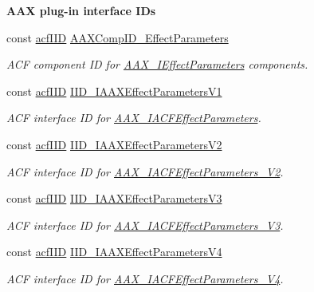 \begin{Indent}{\bf A\+A\+X plug-\/in interface I\+Ds}\par
\begin{DoxyCompactItemize}
\item 
const \hyperlink{a00150_a59df0b41744eee7a066787aaedf97f67}{acf\+I\+I\+D} \hyperlink{a00299_a0f9ba8a7c2177a0fa5042461968fa8ad}{A\+A\+X\+Comp\+I\+D\+\_\+\+Effect\+Parameters}
\begin{DoxyCompactList}\small\item\em A\+C\+F component I\+D for \hyperlink{a00099}{A\+A\+X\+\_\+\+I\+Effect\+Parameters} components. \end{DoxyCompactList}\item 
const \hyperlink{a00150_a59df0b41744eee7a066787aaedf97f67}{acf\+I\+I\+D} \hyperlink{a00299_a8379d320e9eabb19428d005fb6499f88}{I\+I\+D\+\_\+\+I\+A\+A\+X\+Effect\+Parameters\+V1}
\begin{DoxyCompactList}\small\item\em A\+C\+F interface I\+D for \hyperlink{a00061}{A\+A\+X\+\_\+\+I\+A\+C\+F\+Effect\+Parameters}. \end{DoxyCompactList}\item 
const \hyperlink{a00150_a59df0b41744eee7a066787aaedf97f67}{acf\+I\+I\+D} \hyperlink{a00299_a71e92973a70cd9f2fc704b2cf36a5b9a}{I\+I\+D\+\_\+\+I\+A\+A\+X\+Effect\+Parameters\+V2}
\begin{DoxyCompactList}\small\item\em A\+C\+F interface I\+D for \hyperlink{a00062}{A\+A\+X\+\_\+\+I\+A\+C\+F\+Effect\+Parameters\+\_\+\+V2}. \end{DoxyCompactList}\item 
const \hyperlink{a00150_a59df0b41744eee7a066787aaedf97f67}{acf\+I\+I\+D} \hyperlink{a00299_ad49630ca225ea71d751debb379d04192}{I\+I\+D\+\_\+\+I\+A\+A\+X\+Effect\+Parameters\+V3}
\begin{DoxyCompactList}\small\item\em A\+C\+F interface I\+D for \hyperlink{a00063}{A\+A\+X\+\_\+\+I\+A\+C\+F\+Effect\+Parameters\+\_\+\+V3}. \end{DoxyCompactList}\item 
const \hyperlink{a00150_a59df0b41744eee7a066787aaedf97f67}{acf\+I\+I\+D} \hyperlink{a00299_a852f037a3570b88ca1df6186bb524460}{I\+I\+D\+\_\+\+I\+A\+A\+X\+Effect\+Parameters\+V4}
\begin{DoxyCompactList}\small\item\em A\+C\+F interface I\+D for \hyperlink{a00064}{A\+A\+X\+\_\+\+I\+A\+C\+F\+Effect\+Parameters\+\_\+\+V4}. \end{DoxyCompactList}\item 

\end{DoxyCompactItemize}
\end{Indent}
